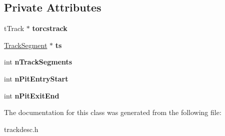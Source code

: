 \subsection*{Private Attributes}
\begin{DoxyCompactItemize}
\item 
\hypertarget{class_track_desc_a641333946cef8a1a27d236f844845065}{t\-Track $\ast$ {\bfseries torcstrack}}\label{class_track_desc_a641333946cef8a1a27d236f844845065}

\item 
\hypertarget{class_track_desc_a6526a88f880faaebf0c52ff8ff668649}{\hyperlink{class_track_segment}{Track\-Segment} $\ast$ {\bfseries ts}}\label{class_track_desc_a6526a88f880faaebf0c52ff8ff668649}

\item 
\hypertarget{class_track_desc_a1ade9394300937420a51ce25d019c6fa}{int {\bfseries n\-Track\-Segments}}\label{class_track_desc_a1ade9394300937420a51ce25d019c6fa}

\item 
\hypertarget{class_track_desc_ad2b61074b7e6e2130a57ff3d80c7c5c8}{int {\bfseries n\-Pit\-Entry\-Start}}\label{class_track_desc_ad2b61074b7e6e2130a57ff3d80c7c5c8}

\item 
\hypertarget{class_track_desc_a2dc5d14b6417aa124e3fc775ae7c45d5}{int {\bfseries n\-Pit\-Exit\-End}}\label{class_track_desc_a2dc5d14b6417aa124e3fc775ae7c45d5}

\end{DoxyCompactItemize}


The documentation for this class was generated from the following file\-:\begin{DoxyCompactItemize}
\item 
trackdesc.\-h\end{DoxyCompactItemize}

